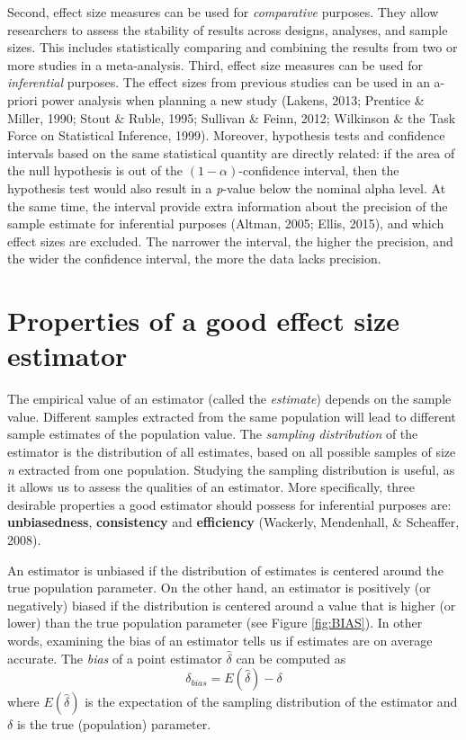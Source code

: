 \documentclass[
  english,
  man,floatsintext]{apa6}
\begin{document}
Second, effect size measures can be used for \emph{comparative} purposes. They allow researchers to assess the stability of results across designs, analyses, and sample sizes. This includes statistically comparing and combining the results from two or more studies in a meta-analysis.
Third, effect size measures can be used for \emph{inferential} purposes. The effect sizes from previous studies can be used in an a-priori power analysis when planning a new study (Lakens, 2013; Prentice \& Miller, 1990; Stout \& Ruble, 1995; Sullivan \& Feinn, 2012; Wilkinson \& the Task Force on Statistical Inference, 1999). Moreover, hypothesis tests and confidence intervals based on the same statistical quantity are directly related: if the area of the null hypothesis is out of the \((1-\alpha)\)-confidence interval, then the hypothesis test would also result in a \emph{p}-value below the nominal alpha level. At the same time, the interval provide extra information about the precision of the sample estimate for inferential purposes (Altman, 2005; Ellis, 2015), and which effect sizes are excluded. The narrower the interval, the higher the precision, and the wider the confidence interval, the more the data lacks precision.

\hypertarget{properties-of-a-good-effect-size-estimator}{%
\section{Properties of a good effect size estimator}\label{properties-of-a-good-effect-size-estimator}}

The empirical value of an estimator (called the \emph{estimate}) depends on the sample value. Different samples extracted from the same population will lead to different sample estimates of the population value. The \emph{sampling distribution} of the estimator is the distribution of all estimates, based on all possible samples of size \emph{n} extracted from one population. Studying the sampling distribution is useful, as it allows us to assess the qualities of an estimator. More specifically, three desirable properties a good estimator should possess for inferential purposes are: \textbf{unbiasedness}, \textbf{consistency} and \textbf{efficiency} (Wackerly, Mendenhall, \& Scheaffer, 2008).

An estimator is unbiased if the distribution of estimates is centered around the true population parameter. On the other hand, an estimator is positively (or negatively) biased if the distribution is centered around a value that is higher (or lower) than the true population parameter (see Figure \ref{fig:BIAS}). In other words, examining the bias of an estimator tells us if estimates are on average accurate. The \emph{bias} of a point estimator \(\hat{\delta}\) can be computed as
\begin{equation} 
\delta_{bias}=E(\hat{\delta})-\delta
\label{eq:BIAS}
\end{equation}
where \(E(\hat{\delta})\) is the expectation of the sampling distribution of the estimator and \(\delta\) is the true (population) parameter.
\end{document}
